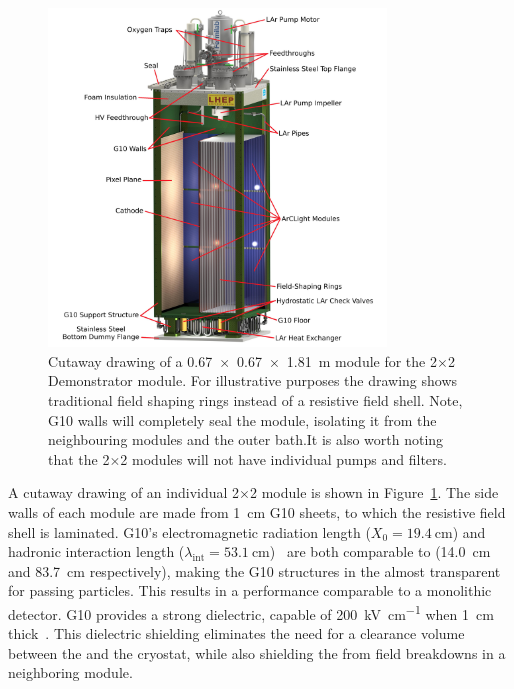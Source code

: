 \begin{figure}[tbp]
	\centering
	\includegraphics[width=0.8\textwidth]{graphics/Normal-Module-4K_labelled.jpeg}
	\caption[ArgonCube module engineering drawing]{Cutaway drawing of a \SI{0.67 x 0.67 x 1.81}{\metre}  module for the 2$\times$2 Demonstrator module. For illustrative purposes the drawing shows traditional field shaping rings instead of a resistive field shell. Note, G10 walls will completely seal the module, isolating it from the neighbouring modules and the outer  bath.It is also worth noting that the 2$\times$2 modules will not have individual pumps and filters.}
	\label{fig:ac_module}
\end{figure}

A cutaway drawing of an individual 2$\times$2 module is shown in Figure~\ref{fig:ac_module}. The side walls of each module are made from \SI{1}{\centi\metre} G10 sheets, to which the resistive field shell is laminated. G10's electromagnetic radiation length ($X_{\mathrm{0}} = \SI{19.4}{\centi\metre}$) and hadronic interaction length ($\lambda_{\mathrm{int}} = \SI{53.1}{\centi\metre}$)~\cite{Tanabashi:2018oca} %
are both comparable to  (14.0~cm and 83.7~cm respectively), making the G10 structures in the  almost transparent for passing particles. This results in a performance comparable to a monolithic detector. G10 provides a strong dielectric, capable of \SI{200}{\kilo\volt\per\centi\metre} when \SI{1}{\centi\metre} thick~\cite{G10Breakdown}. This dielectric shielding eliminates the need for a clearance volume between the  and the cryostat, while also shielding the  from field breakdowns in a neighboring module. 

